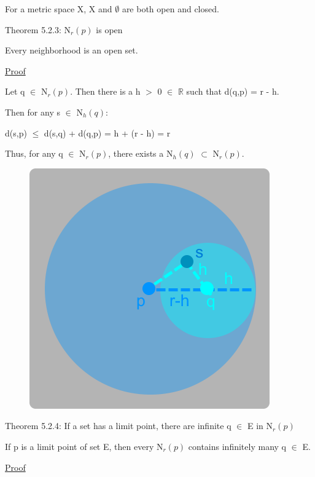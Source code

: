 	\qquad For a metric space X, X and $\emptyset$ are both open and closed.

\newpage

{ \color{red} Theorem 5.2.3: N$_r(p)$ is open } 

	\begin{adjustbox}{minipage=14cm, right, vspace=0.1cm 0cm}
		Every neighborhood is an open set.
	\end{adjustbox}

{ \color{magenta} \underline{Proof} } 
	
	Let q $\in$ N$_r(p)$. Then there is a h $>$ 0 $\in$ $\mathbb{R}$
	such that d(q,p) = r - h.

	Then for any s $\in$ N$_h(q)$:

	\qquad d(s,p) $\leq$  d(s,q) + d(q,p) = h + (r - h) = r

	Thus, for any q $\in$ N$_r(p)$, there exists a N$_h(q)$ $\subset$ N$_r(p)$.

\begin{figure}[h]
	\centering
	\includegraphics[scale=0.36]{Images/5.2.3.png}
\end{figure}

{ \color{red} Theorem 5.2.4: If a set has a limit point, there are infinite q
$\in$ E in N$_r(p)$ } 
	
	\begin{adjustbox}{minipage=14cm, right, vspace=0.1cm 0cm}
		If p is a limit point of set E, then every N$_r(p)$ contains infinitely many q $\in$ E.
	\end{adjustbox}

{ \color{magenta} \underline{Proof} } 
	
